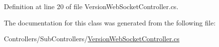 Definition at line 20 of file Version\+Web\+Socket\+Controller.\+cs.



The documentation for this class was generated from the following file\+:\begin{DoxyCompactItemize}
\item 
Controllers/\+Sub\+Controllers/\mbox{\hyperlink{_version_web_socket_controller_8cs}{Version\+Web\+Socket\+Controller.\+cs}}\end{DoxyCompactItemize}
